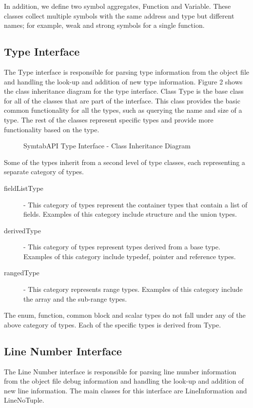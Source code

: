 In addition, we define two symbol aggregates, Function and Variable. These classes collect multiple symbols with the same address and type but different names; for example, weak and strong symbols for a single function. 

\subsection{Type Interface}
 The Type interface is responsible for parsing type information from the object file and handling the look-up and addition of new type information. Figure 2 shows the class inheritance diagram for the type interface. Class Type is the base class for all of the classes that are part of the interface. This class provides the basic common functionality for all the types, such as querying the name and size of a type. The rest of the classes represent specific types and provide more functionality based on the type. 

 \begin{figure}
     \caption{SymtabAPI Type Interface - Class Inheritance Diagram}
     \label{fig:class-inherit}
 \end{figure}

Some of the types inherit from a second level of type classes, each representing a separate category of types. 
\begin{description}
\item[fieldListType] - This category of types represent the container types that contain a list of fields. Examples of this category include structure and the union types. 
\item[derivedType] - This category of types represent types derived from a base type. Examples of this category include typedef, pointer and reference types. 
\item[rangedType] - This category represents range types. Examples of this category include the array and the sub-range types. 
\end{description}
The enum, function, common block and scalar types do not fall under any of the above category of types. Each of the specific types is derived from Type.

\subsection{Line Number Interface}

The Line Number interface is responsible for parsing line number information from the object file debug information and handling the look-up and addition of new line information. The main classes for this interface are LineInformation and LineNoTuple. 

